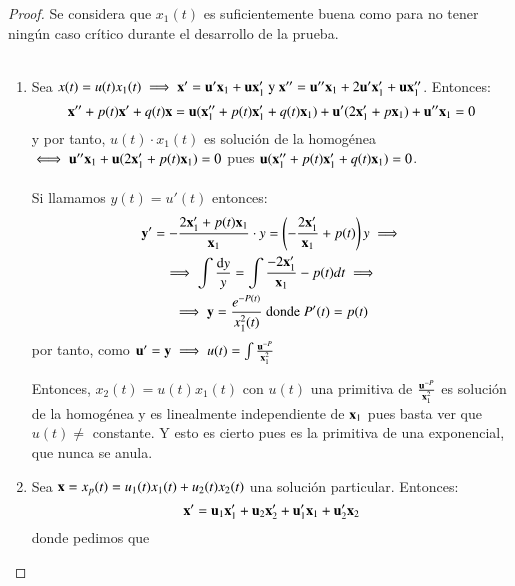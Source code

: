 \begin{proof}
    Se considera que $x_1(t)$ es suficientemente buena como para no tener ningún caso crítico durante el desarrollo de la prueba.\\\\
    \begin{enumerate}
        \item Sea $x(t) = u(t)x_1(t) \implies \mathbf{x}' = \mathbf{u}'\mathbf{x}_1 + \mathbf{u}\mathbf{x}_1' \text{ y } \mathbf{x}'' = \mathbf{u}''\mathbf{x}_1 + 2\mathbf{u}'\mathbf{x}_1' + \mathbf{u}\mathbf{x}_1''$. Entonces:
        $$
            \mathbf{x}'' + p(t)\mathbf{x}' + q(t)\mathbf{x} = \mathbf{u}(\mathbf{x}_1'' +p(t)\mathbf{x}_1' + q(t)\mathbf{x}_1) + \mathbf{u}'(2\mathbf{x}_1' + p\mathbf{x}_1) + \mathbf{u}''\mathbf{x}_1= 0
        $$ y por tanto, $u(t) \cdot x_1(t)$ es solución de la homogénea $\iff \mathbf{u}''\mathbf{x}_1 + \mathbf{u}(2\mathbf{x}_1' + p(t)\mathbf{x}_1) = 0$ pues $ \mathbf{u}(\mathbf{x}_1'' +p(t)\mathbf{x}_1' + q(t)\mathbf{x}_1) = 0$.\\\\
        Si llamamos $y(t) = u'(t)$ entonces:
        \begin{gather*}
            \mathbf{y}' = -\frac{2\mathbf{x}_1' + p(t)\mathbf{x}_1}{\mathbf{x}_1}\cdot y = \left(-\frac{2\mathbf{x}_1'}{\mathbf{x}_1} + p(t) \right) y \implies \\
            \implies \int \frac{\mathrm{d} y}{y} = \int \frac{-2\mathbf{x}_1'}{\mathbf{x}_1} - p(t) dt \implies \\
            \implies \mathbf{y} = \frac{e^{-P(t)}}{x_1^2(t)} \text{ donde } P'(t) = p(t)
        \end{gather*}
        por tanto, como $\mathbf{u}' = \mathbf{y} \implies u(t) = \int \frac{\mathbf{u}^{-P}}{\mathbf{x}_1^2} $

    Entonces, $x_2(t) = u(t)x_1(t)$ con $u(t)$ una primitiva de $\frac{\mathbf{u}^{-P}}{\mathbf{x}_1^2} $ es solución de la homogénea y es linealmente independiente de $\mathbf{x}_1$ pues basta ver que $u(t) \neq $ constante. Y esto es cierto pues es la primitiva de una exponencial, que nunca se anula.
    \item Sea $\mathbf{x} = x_p(t) = u_1(t) x_1(t) + u_2(t)x_2(t)$ una solución particular. Entonces:
    $$
        \mathbf{x}' = \mathbf{u}_1 \mathbf{x}_1' + \mathbf{u}_2 \mathbf{x}_2' + \mathbf{u}_1' \mathbf{x}_1 + \mathbf{u}_2' \mathbf{x}_2
    $$
    donde pedimos que


\end{enumerate}
\end{proof}
